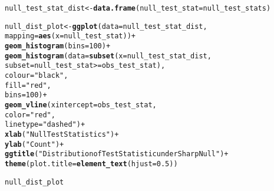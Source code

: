 \documentclass[11pt]{article}\usepackage[]{graphicx}\usepackage[]{color}
\makeatletter
\newcommand{\hlnum}[1]{\textcolor[rgb]{0.686,0.059,0.569}{#1}}%
\newcommand{\hlstr}[1]{\textcolor[rgb]{0.192,0.494,0.8}{#1}}%
\newcommand{\hlopt}[1]{\textcolor[rgb]{0,0,0}{#1}}%
\newcommand{\hlstd}[1]{\textcolor[rgb]{0.345,0.345,0.345}{#1}}%
\newcommand{\hlkwb}[1]{\textcolor[rgb]{0.69,0.353,0.396}{#1}}%
\newcommand{\hlkwc}[1]{\textcolor[rgb]{0.333,0.667,0.333}{#1}}%
\newcommand{\hlkwd}[1]{\textcolor[rgb]{0.737,0.353,0.396}{\textbf{#1}}}%
\newenvironment{kframe}{%
 \def\at@end@of@kframe{}%
 \ifinner\ifhmode%
  \def\at@end@of@kframe{\end{minipage}}%
  \begin{minipage}{\columnwidth}%
 \fi\fi%
 \def\FrameCommand##1{\hskip\@totalleftmargin \hskip-\fboxsep
 \colorbox{shadecolor}{##1}\hskip-\fboxsep
     \hskip-\linewidth \hskip-\@totalleftmargin \hskip\columnwidth}%
 \MakeFramed {\advance\hsize-\width
   \@totalleftmargin\z@ \linewidth\hsize
   \@setminipage}}%
 {\par\unskip\endMakeFramed%
 \at@end@of@kframe}
\newenvironment{knitrout}{}{} %
\theoremstyle{newstyle}
\makeatother
\begin{document}
\begin{knitrout}
\begin{kframe}
{\ttfamily\noindent\bfseries\color{errorcolor}{\#\# Error in sample(acorn\_data\_subset\$z): object 'acorn\_data\_subset' not found}}\begin{alltt}
\hlstd{null_test_stat_dist} \hlkwb{<-} \hlkwd{data.frame}\hlstd{(}\hlkwc{null_test_stat} \hlstd{= null_test_stats)}
\end{alltt}


{\ttfamily\noindent\bfseries\color{errorcolor}{\#\# Error in data.frame(null\_test\_stat = null\_test\_stats): object 'null\_test\_stats' not found}}\begin{alltt}
\hlstd{null_dist_plot} \hlkwb{<-} \hlkwd{ggplot}\hlstd{(}\hlkwc{data} \hlstd{= null_test_stat_dist,}
                         \hlkwc{mapping} \hlstd{=} \hlkwd{aes}\hlstd{(}\hlkwc{x} \hlstd{= null_test_stat))} \hlopt{+}
  \hlkwd{geom_histogram}\hlstd{(}\hlkwc{bins} \hlstd{=} \hlnum{100}\hlstd{)} \hlopt{+}
  \hlkwd{geom_histogram}\hlstd{(}\hlkwc{data} \hlstd{=} \hlkwd{subset}\hlstd{(}\hlkwc{x} \hlstd{= null_test_stat_dist,}
                               \hlkwc{subset} \hlstd{= null_test_stat} \hlopt{>=} \hlstd{obs_test_stat),}
                 \hlkwc{colour} \hlstd{=} \hlstr{"black"}\hlstd{,}
                 \hlkwc{fill} \hlstd{=} \hlstr{"red"}\hlstd{,}
                 \hlkwc{bins} \hlstd{=} \hlnum{100}\hlstd{)} \hlopt{+}
  \hlkwd{geom_vline}\hlstd{(}\hlkwc{xintercept} \hlstd{= obs_test_stat,}
             \hlkwc{color} \hlstd{=} \hlstr{"red"}\hlstd{,}
             \hlkwc{linetype} \hlstd{=} \hlstr{"dashed"}\hlstd{)} \hlopt{+}
  \hlkwd{xlab}\hlstd{(}\hlstr{"Null Test Statistics"}\hlstd{)} \hlopt{+}
  \hlkwd{ylab}\hlstd{(}\hlstr{"Count"}\hlstd{)} \hlopt{+}
  \hlkwd{ggtitle}\hlstd{(}\hlstr{"Distribution of Test Statistic under Sharp Null"}\hlstd{)} \hlopt{+}
  \hlkwd{theme}\hlstd{(}\hlkwc{plot.title} \hlstd{=} \hlkwd{element_text}\hlstd{(}\hlkwc{hjust} \hlstd{=} \hlnum{0.5}\hlstd{))}
\end{alltt}


{\ttfamily\noindent\bfseries\color{errorcolor}{\#\# Error in ggplot(data = null\_test\_stat\_dist, mapping = aes(x = null\_test\_stat)): object 'null\_test\_stat\_dist' not found}}\begin{alltt}
\hlstd{null_dist_plot}
\end{alltt}


{\ttfamily\noindent\bfseries\color{errorcolor}{\#\# Error in eval(expr, envir, enclos): object 'null\_dist\_plot' not found}}\end{kframe}
\end{knitrout}
\end{document}
